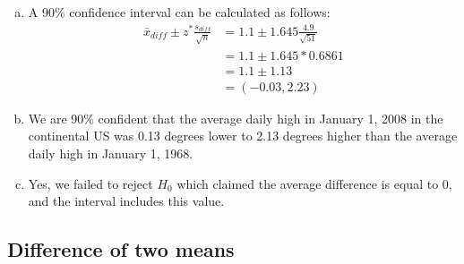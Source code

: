 %

{
{
\begin{enumerate}[(a)]
\item A 90\% confidence interval can be calculated as follows:
\begin{align*}
\bar{x}_{diff} \pm z^* \frac{s_{diff}}{\sqrt{n}} &= 1.1 \pm 1.645 \frac{4.9}{\sqrt{51}} \\
&= 1.1 \pm 1.645 * 0.6861 \\
&= 1.1 \pm 1.13 \\
&= (-0.03, 2.23)
\end{align*}
\item We are 90\% confident that the average daily high in January 1, 2008 in the continental US was 0.13 degrees lower to 2.13 degrees higher than the average daily high in January 1, 1968.
\item Yes, we failed to reject $H_0$ which claimed the average difference is equal to 0, and the interval includes this value.
\end{enumerate}
}
}

%

\subsection{Difference of two means}




